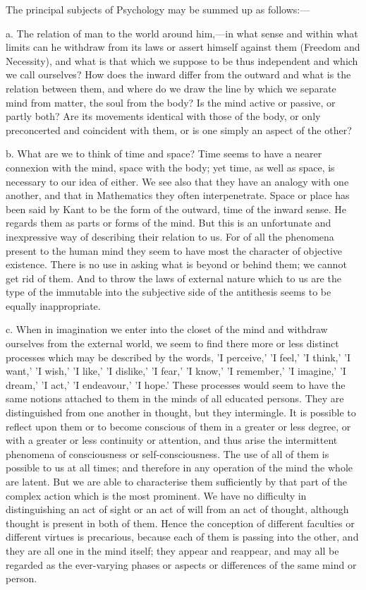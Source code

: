 \documentclass[11pt,letter]{article}
\begin{document}
\par  The principal subjects of Psychology may be summed up as follows:—

\par  a. The relation of man to the world around him,—in what sense and within what limits can he withdraw from its laws or assert himself against them (Freedom and Necessity), and what is that which we suppose to be thus independent and which we call ourselves? How does the inward differ from the outward and what is the relation between them, and where do we draw the line by which we separate mind from matter, the soul from the body? Is the mind active or passive, or partly both? Are its movements identical with those of the body, or only preconcerted and coincident with them, or is one simply an aspect of the other?

\par  b. What are we to think of time and space? Time seems to have a nearer connexion with the mind, space with the body; yet time, as well as space, is necessary to our idea of either. We see also that they have an analogy with one another, and that in Mathematics they often interpenetrate. Space or place has been said by Kant to be the form of the outward, time of the inward sense. He regards them as parts or forms of the mind. But this is an unfortunate and inexpressive way of describing their relation to us. For of all the phenomena present to the human mind they seem to have most the character of objective existence. There is no use in asking what is beyond or behind them; we cannot get rid of them. And to throw the laws of external nature which to us are the type of the immutable into the subjective side of the antithesis seems to be equally inappropriate.

\par  c. When in imagination we enter into the closet of the mind and withdraw ourselves from the external world, we seem to find there more or less distinct processes which may be described by the words, 'I perceive,' 'I feel,' 'I think,' 'I want,' 'I wish,' 'I like,' 'I dislike,' 'I fear,' 'I know,' 'I remember,' 'I imagine,' 'I dream,' 'I act,' 'I endeavour,' 'I hope.' These processes would seem to have the same notions attached to them in the minds of all educated persons. They are distinguished from one another in thought, but they intermingle. It is possible to reflect upon them or to become conscious of them in a greater or less degree, or with a greater or less continuity or attention, and thus arise the intermittent phenomena of consciousness or self-consciousness. The use of all of them is possible to us at all times; and therefore in any operation of the mind the whole are latent. But we are able to characterise them sufficiently by that part of the complex action which is the most prominent. We have no difficulty in distinguishing an act of sight or an act of will from an act of thought, although thought is present in both of them. Hence the conception of different faculties or different virtues is precarious, because each of them is passing into the other, and they are all one in the mind itself; they appear and reappear, and may all be regarded as the ever-varying phases or aspects or differences of the same mind or person.
\end{document}

